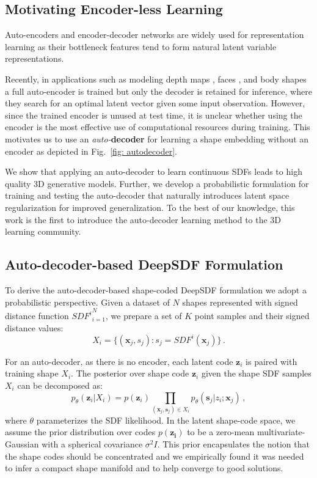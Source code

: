 \documentclass[10pt,twocolumn,letterpaper]{article}
\begin{document}
\subsection{Motivating Encoder-less Learning}

Auto-encoders and encoder-decoder networks are widely used for representation learning as their bottleneck features tend to form natural latent variable representations. 

Recently, in applications such as modeling depth maps \cite{bloesch2018codeslam}, faces \cite{bagautdinov2018modeling}, and body shapes \cite{litany2017deformable} a full auto-encoder is trained but only the decoder is retained for inference, where they search for an optimal latent vector given some input observation.
However, since the trained encoder is unused at test time, it is unclear whether using the encoder is the most effective use of computational resources during training.
%
%
%
This motivates us to use an \textit{auto-}\textbf{decoder} for learning a shape embedding without an encoder as depicted in Fig.~\ref{fig: autodecoder}. 

We show that applying an auto-decoder to learn continuous SDFs leads to high quality 3D generative models. Further, we develop a probabilistic formulation for training and testing the auto-decoder that naturally introduces latent space regularization for improved generalization. To the best of our knowledge, this work is the first to introduce the auto-decoder learning method to the 3D learning community.


\subsection{Auto-decoder-based DeepSDF Formulation} \label{sec:autodecoder}
To derive the auto-decoder-based shape-coded DeepSDF formulation we adopt a probabilistic perspective. 
Given a dataset of $N$ shapes represented with signed distance function ${SDF^i}_{i=1}^{N}$, we prepare a set of $K$ point samples and their signed distance values:
\begin{equation} \label{eq:datapoint}
X_i = \{(\bm{x}_j,s_j):s_j=SDF^i(\bm{x}_j)\}\,.
\end{equation}

For an auto-decoder, as there is no encoder, each latent code $\bm{z}_i$ is paired with training shape $X_i$. 
The posterior over shape code $\bm{z}_i$ given the shape SDF samples $X_i$ can be decomposed as:
\begin{equation}
p_{\theta}(\bm{z}_i|X_i)=
p(\bm{z}_i) \textstyle \prod_{(\bm{x}_j,\bm{s}_j)\in X_i}p_{\theta}(\bm{s}_j | z_i; \bm{x}_j) \,,
\end{equation}
where $\theta$ parameterizes the SDF likelihood. In the latent shape-code space, we assume the prior distribution over codes $p(\bm{z_i})$ to be a zero-mean multivariate-Gaussian with a spherical covariance $\sigma^2 I$. This prior encapsulates the notion that the shape codes should be concentrated and we empirically found it was needed to infer a compact shape manifold and
to help converge to good solutions.
\end{document}
